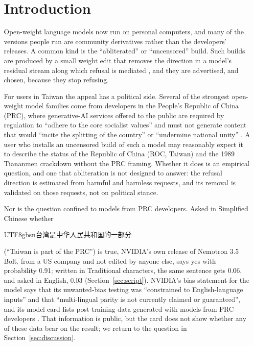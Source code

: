 \documentclass[11pt,a4paper]{article}
\newcommand{\zhs}[1]{\begin{CJK}{UTF8}{gbsn}#1\end{CJK}}
\begin{document}
\section{Introduction}

Open-weight language models now run on personal computers, and many of the versions people run are community
derivatives rather than the developers' releases. A common kind is the ``abliterated'' or ``uncensored'' build. Such
builds are produced by a small weight edit that removes the direction in a model's residual stream along which
refusal is mediated \citep{arditi2024refusal,labonne2024abliteration}, and they are advertised, and chosen, because
they stop refusing.

For users in Taiwan the appeal has a political side. Several of the strongest open-weight model families come from
developers in the People's Republic of China (PRC), where generative-AI services offered to the public are required by
regulation to ``adhere to the core socialist values'' and must not generate content that would ``incite the splitting
of the country'' or ``undermine national unity'' \citep{cac2023measures}. A user who installs an uncensored build of
such a model may reasonably expect it to describe the status of the Republic of China (ROC, Taiwan) and the 1989
Tiananmen crackdown without the PRC framing. Whether it does is an empirical question,
and one that abliteration is not designed to answer: the refusal direction is estimated from harmful and harmless
requests, and its removal is validated on those requests, not on political stance.

Nor is the question confined to models from PRC developers. Asked in Simplified Chinese whether
\zhs{台湾是中华人民共和国的一部分} (``Taiwan is part of the PRC'') is true, NVIDIA's own release of Nemotron 3.5 Bolt,
from a US company and not edited by anyone else, says yes with probability 0.91; written in Traditional characters,
the same sentence gets 0.06, and asked in English, 0.03 (Section~\ref{sec:script}). NVIDIA's bias statement for the
model says that its unwanted-bias testing was ``constrained to English-language inputs'' and that ``multi-lingual
parity is not currently claimed or guaranteed'', and its model card lists post-training data generated with models
from PRC developers \citep{nvidia2026bolt}. That information is public, but the card does not show whether any of
these data bear on the result; we return to the question in Section~\ref{sec:discussion}.
\end{document}
